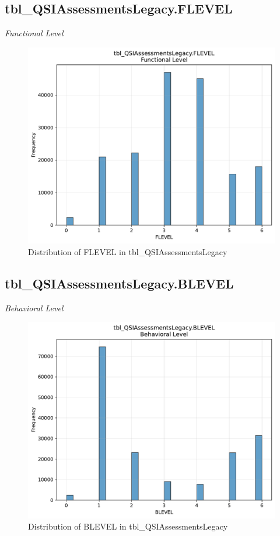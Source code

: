 \subsection{tbl\_QSIAssessmentsLegacy.FLEVEL}
\textit{Functional Level}

\begin{figure}[htbp]
\centering
\includegraphics[width=\textwidth]{figures/dbo_tbl_QSIAssessmentsLegacy_FLEVEL.pdf}
\caption{Distribution of FLEVEL in tbl\_QSIAssessmentsLegacy}
\end{figure}\newpage

\subsection{tbl\_QSIAssessmentsLegacy.BLEVEL}
\textit{Behavioral Level}

\begin{figure}[htbp]
\centering
\includegraphics[width=\textwidth]{figures/dbo_tbl_QSIAssessmentsLegacy_BLEVEL.pdf}
\caption{Distribution of BLEVEL in tbl\_QSIAssessmentsLegacy}
\end{figure}\newpage

